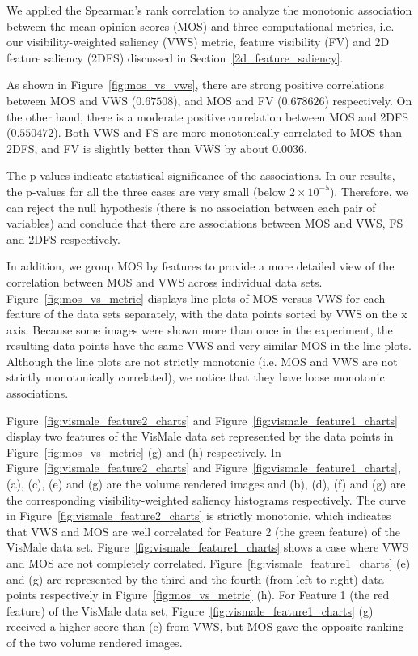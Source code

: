 We applied the Spearman's rank correlation to analyze the monotonic association between the mean opinion scores (MOS) and three computational metrics, i.e. our visibility-weighted saliency (VWS) metric, feature visibility (FV) \cite{wang_efficient_2011} and 2D feature saliency (2DFS) discussed in Section~\ref{2d_feature_saliency}.

As shown in Figure~\ref{fig:mos_vs_vws}, there are strong positive correlations between MOS and VWS ($ 0.67508 $), and MOS and FV ($ 0.678626 $) respectively. On the other hand, there is a moderate positive correlation between MOS and 2DFS ($ 0.550472 $). Both VWS and FS are more monotonically correlated to MOS than 2DFS, and FV is slightly better than VWS by about $ 0.0036 $.

The p-values indicate statistical significance of the associations. In our results, the p-values for all the three cases are very small (below $2 \times 10^{-5} $). Therefore, we can reject the null hypothesis (there is no association between each pair of variables) and conclude that there are associations between MOS and VWS, FS and 2DFS respectively.

In addition, we group MOS by features to provide a more detailed view of the correlation between MOS and VWS across individual data sets.
Figure~\ref{fig:mos_vs_metric} displays line plots of MOS versus VWS for each feature of the data sets separately, with the data points sorted by VWS on the x axis.
Because some images were shown more than once in the experiment, the resulting data points have the same VWS and very similar MOS in the line plots.
Although the line plots are not strictly monotonic (i.e. MOS and VWS are not strictly monotonically correlated), we notice that they have loose monotonic associations.

Figure~\ref{fig:vismale_feature2_charts} and Figure~\ref{fig:vismale_feature1_charts} display two features of the VisMale data set represented by the data points in Figure~\ref{fig:mos_vs_metric} (g) and (h) respectively.
In Figure~\ref{fig:vismale_feature2_charts} and Figure~\ref{fig:vismale_feature1_charts}, (a), (c), (e) and (g) are the volume rendered images and (b), (d), (f) and (g) are the corresponding visibility-weighted saliency histograms respectively.
The curve in Figure~\ref{fig:vismale_feature2_charts} is strictly monotonic, which indicates that VWS and MOS are well correlated for Feature 2 (the green feature) of the VisMale data set.
Figure~\ref{fig:vismale_feature1_charts} shows a case where VWS and MOS are not completely correlated. Figure~\ref{fig:vismale_feature1_charts} (e) and (g) are represented by the third and the fourth (from left to right) data points respectively in Figure~\ref{fig:mos_vs_metric} (h).
For Feature 1 (the red feature) of the VisMale data set, Figure~\ref{fig:vismale_feature1_charts} (g) received a higher score than (e) from VWS, but MOS gave the opposite ranking of the two volume rendered images.

